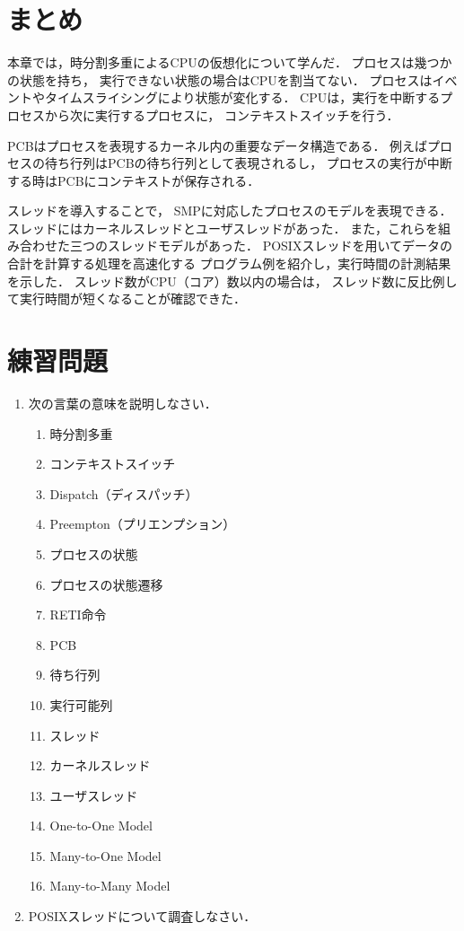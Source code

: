 \section{まとめ}
本章では，時分割多重によるCPUの仮想化について学んだ．
プロセスは幾つかの状態を持ち，
実行できない状態の場合はCPUを割当てない．
プロセスはイベントやタイムスライシングにより状態が変化する．
CPUは，実行を中断するプロセスから次に実行するプロセスに，
コンテキストスイッチを行う．

PCBはプロセスを表現するカーネル内の重要なデータ構造である．
例えばプロセスの待ち行列はPCBの待ち行列として表現されるし，
プロセスの実行が中断する時はPCBにコンテキストが保存される．

スレッドを導入することで，
SMPに対応したプロセスのモデルを表現できる．
スレッドにはカーネルスレッドとユーザスレッドがあった．
また，これらを組み合わせた三つのスレッドモデルがあった．
POSIXスレッドを用いてデータの合計を計算する処理を高速化する
プログラム例を紹介し，実行時間の計測結果を示した．
スレッド数がCPU（コア）数以内の場合は，
スレッド数に反比例して実行時間が短くなることが確認できた．

\section*{練習問題}
\begin{enumerate}
  \renewcommand{\labelenumi}{\ttfamily\arabic{chapter}.\arabic{enumi}}
  \setlength{\leftskip}{1em}
\item 次の言葉の意味を説明しなさい．
  \begin{enumerate}
    \item 時分割多重
    \item コンテキストスイッチ
    \item Dispatch（ディスパッチ）
    \item Preempton（プリエンプション）
    \item プロセスの状態
    \item プロセスの状態遷移
    \item RETI命令
    \item PCB
    \item 待ち行列
    \item 実行可能列
    \item スレッド
    \item カーネルスレッド
    \item ユーザスレッド
    \item One-to-One Model
    \item Many-to-One Model
    \item Many-to-Many Model
  \end{enumerate}
\item POSIXスレッドについて調査しなさい．
\end{enumerate}
